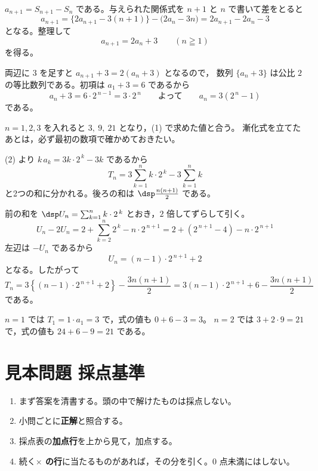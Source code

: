 $a_{n+1}=S_{n+1}-S_{n}$ である。与えられた関係式を $n+1$ と $n$ で書いて差をとると
\[
  a_{n+1}=\bigl\{2a_{n+1}-3(n+1)\bigr\}-\bigl(2a_{n}-3n\bigr)=2a_{n+1}-2a_{n}-3
\]
となる。整理して
\[
  a_{n+1}=2a_{n}+3\qquad(n\geqq1)
\]
を得る。

\smallskip
両辺に $3$ を足すと $a_{n+1}+3=2\left(a_{n}+3\right)$ となるので，
数列 $\{a_{n}+3\}$ は公比 $2$ の等比数列である。初項は $a_{1}+3=6$ であるから
\[
  a_{n}+3=6\cdot2^{\,n-1}=3\cdot2^{\,n}
  \qquad\text{よって}\qquad
  a_{n}=3\left(2^{\,n}-1\right)
\]
である。


$n=1,2,3$ を入れると $3,\ 9,\ 21$ となり，(1) で求めた値と合う。
漸化式を立てたあとは，必ず最初の数項で確かめておきたい。

(2) より $k\,a_{k}=3k\cdot2^{\,k}-3k$ であるから
\[
  T_{n}=3\sum_{k=1}^{n}k\cdot2^{\,k}-3\sum_{k=1}^{n}k
\]
と2つの和に分かれる。後ろの和は $\dsp\frac{n(n+1)}{2}$ である。

\smallskip
前の和を $\dsp U_{n}=\sum_{k=1}^{n}k\cdot2^{\,k}$ とおき，$2$ 倍してずらして引く。
\[
  U_{n}-2U_{n}=2+\sum_{k=2}^{n}2^{\,k}-n\cdot2^{\,n+1}
             =2+\left(2^{\,n+1}-4\right)-n\cdot2^{\,n+1}
\]
左辺は $-U_{n}$ であるから
\[
  U_{n}=(n-1)\cdot2^{\,n+1}+2
\]
となる。したがって
\[
  T_{n}=3\left\{(n-1)\cdot2^{\,n+1}+2\right\}-\frac{3n(n+1)}{2}
       =3(n-1)\cdot2^{\,n+1}+6-\frac{3n(n+1)}{2}
\]
である。


$n=1$ では $T_{1}=1\cdot a_{1}=3$ で，式の値も $0+6-3=3$。
$n=2$ では $3+2\cdot9=21$ で，式の値も $24+6-9=21$ である。

\clearpage
\section*{見本問題 採点基準}

\begin{enumerate}[leftmargin=2.2em,itemsep=3pt,topsep=3pt]
  \item まず答案を清書する。頭の中で解けたものは採点しない。
  \item 小問ごとに\textbf{正解}と照合する。
  \item 採点表の\textbf{加点行}を上から見て，加点する。
  \item 続く\textbf{$\times$ の行}に当たるものがあれば，その分を引く。$0$ 点未満にはしない。
\end{enumerate}

